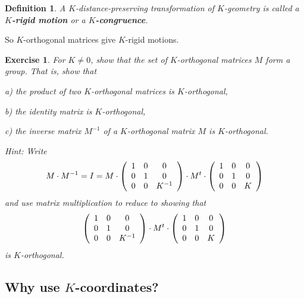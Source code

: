 \documentclass{article}%
\newtheorem{definition}[theorem]{Definition}
\newtheorem{exercise}[theorem]{Exercise}
\begin{document}
\begin{definition}
A $K$-distance-preserving transformation of $K$-geometry is called a
$K$\textbf{-rigid motion} or a $K$\textbf{-congruence}.
\end{definition}

So $K$-orthogonal matrices give $K$-rigid motions.

\begin{exercise}
For $K\neq0$, show that the set of $K$-orthogonal matrices $M$ form a group.
That is, show that

a) the product of two $K$-orthogonal matrices is $K$-orthogonal,

b) the identity matrix is $K$-orthogonal,

c) the inverse matrix $M^{-1}$ of a $K$-orthogonal matrix $M$ is $K$-orthogonal.

Hint: Write%
\[
M\cdot M^{-1}=I=M\cdot\left(
\begin{array}
[c]{ccc}%
1 & 0 & 0\\
0 & 1 & 0\\
0 & 0 & K^{-1}%
\end{array}
\right)  \cdot M^{t}\cdot\left(
\begin{array}
[c]{ccc}%
1 & 0 & 0\\
0 & 1 & 0\\
0 & 0 & K
\end{array}
\right)
\]
and use matrix multiplication to reduce to showing that
\[
\left(
\begin{array}
[c]{ccc}%
1 & 0 & 0\\
0 & 1 & 0\\
0 & 0 & K^{-1}%
\end{array}
\right)  \cdot M^{t}\cdot\left(
\begin{array}
[c]{ccc}%
1 & 0 & 0\\
0 & 1 & 0\\
0 & 0 & K
\end{array}
\right)
\]
is $K$-orthogonal.\pagebreak
\end{exercise}

\subsection{Why use $K$-coordinates?}
\end{document}
